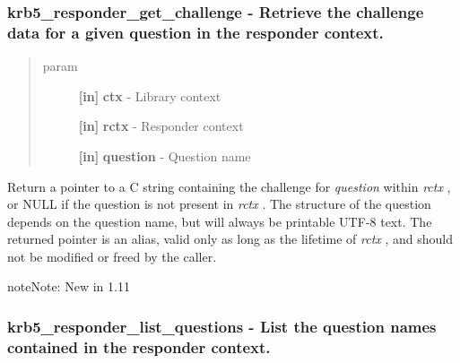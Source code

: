 \documentclass[letterpaper,10pt,english]{sphinxmanual}
\begin{document}
\subsubsection{krb5\_responder\_get\_challenge -  Retrieve the challenge data for a given question in the responder context.}
\label{appdev/refs/api/krb5_responder_get_challenge:krb5-responder-get-challenge-retrieve-the-challenge-data-for-a-given-question-in-the-responder-context}\label{appdev/refs/api/krb5_responder_get_challenge::doc}

\begin{fulllineitems}
\label{appdev/refs/api/krb5_responder_get_challenge:c.krb5_responder_get_challenge}
\end{fulllineitems}

\begin{quote}\begin{description}
\item[{param}] \leavevmode
\textbf{{[}in{]}} \textbf{ctx} - Library context

\textbf{{[}in{]}} \textbf{rctx} - Responder context

\textbf{{[}in{]}} \textbf{question} - Question name

\end{description}\end{quote}

Return a pointer to a C string containing the challenge for \emph{question} within \emph{rctx} , or NULL if the question is not present in \emph{rctx} . The structure of the question depends on the question name, but will always be printable UTF-8 text. The returned pointer is an alias, valid only as long as the lifetime of \emph{rctx} , and should not be modified or freed by the caller.

\begin{notice}{note}{Note:}
New in 1.11
\end{notice}


\subsubsection{krb5\_responder\_list\_questions -  List the question names contained in the responder context.}
\label{appdev/refs/api/krb5_responder_list_questions::doc}\label{appdev/refs/api/krb5_responder_list_questions:krb5-responder-list-questions-list-the-question-names-contained-in-the-responder-context}
\end{document}
